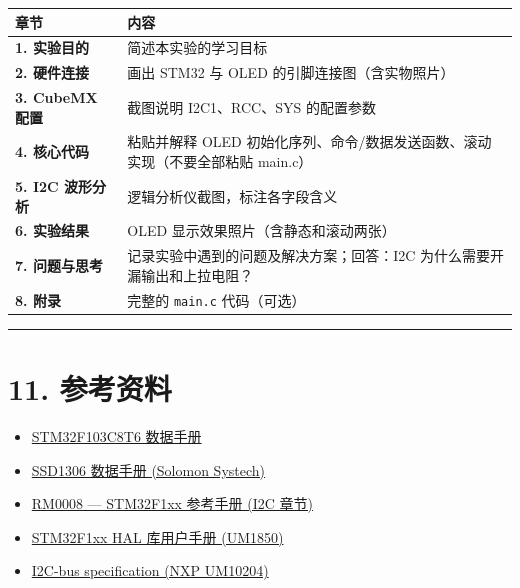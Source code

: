 \documentclass[
  chinese,
  UTF8,
  oneside,
  openany]{ctexbook}
\providecommand{\tightlist}{%
  \setlength{\itemsep}{0pt}\setlength{\parskip}{0pt}}
\begin{document}
\begin{longtable}[]{@{}
  >{\raggedright\arraybackslash}p{}
  >{\raggedright\arraybackslash}p{}@{}}
\toprule\noalign{}
\begin{minipage}[b]{\linewidth}\raggedright
章节
\end{minipage} & \begin{minipage}[b]{\linewidth}\raggedright
内容
\end{minipage} \\
\midrule\noalign{}
\endhead
\bottomrule\noalign{}
\endlastfoot
\textbf{1. 实验目的} & 简述本实验的学习目标 \\
\textbf{2. 硬件连接} & 画出 STM32 与 OLED 的引脚连接图（含实物照片） \\
\textbf{3. CubeMX 配置} & 截图说明 I2C1、RCC、SYS 的配置参数 \\
\textbf{4. 核心代码} & 粘贴并解释 OLED
初始化序列、命令/数据发送函数、滚动实现（不要全部粘贴 main.c） \\
\textbf{5. I2C 波形分析} & 逻辑分析仪截图，标注各字段含义 \\
\textbf{6. 实验结果} & OLED 显示效果照片（含静态和滚动两张） \\
\textbf{7. 问题与思考} & 记录实验中遇到的问题及解决方案；回答：I2C
为什么需要开漏输出和上拉电阻？ \\
\textbf{8. 附录} & 完整的 \texttt{main.c} 代码（可选） \\
\end{longtable}

\begin{center}\rule{0.5\linewidth}{0.5pt}\end{center}

\section{11. 参考资料}\label{ux53c2ux8003ux8d44ux6599-2}

\begin{itemize}
\tightlist
\item
  \href{https://www.st.com/resource/en/datasheet/stm32f103c8.pdf}{STM32F103C8T6
  数据手册}
\item
  \href{https://cdn-shop.adafruit.com/datasheets/SSD1306.pdf}{SSD1306
  数据手册 (Solomon Systech)}
\item
  \href{https://www.st.com/resource/en/reference_manual/rm0008-stm32f101xx-stm32f102xx-stm32f103xx-stm32f105xx-and-stm32f107xx-advanced-armbased-32bit-mcus-stmicroelectronics.pdf}{RM0008
  --- STM32F1xx 参考手册 (I2C 章节)}
\item
  \href{https://www.st.com/resource/en/user_manual/um1850-description-of-stm32f1-hal-and-lowlayer-drivers-stmicroelectronics.pdf}{STM32F1xx
  HAL 库用户手册 (UM1850)}
\item
  \href{https://www.nxp.com/docs/en/user-guide/UM10204.pdf}{I2C-bus
  specification (NXP UM10204)}
\end{itemize}
\end{document}

